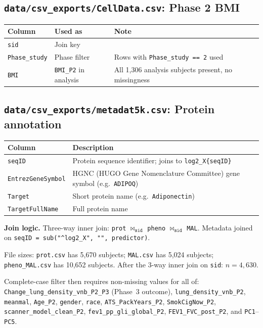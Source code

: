 \documentclass[11pt, letterpaper]{article}
\begin{document}
\subsection*{\texttt{data/csv\_exports/CellData.csv}: Phase 2 BMI}

\begin{tabular}{lll}
\toprule
Column & Used as & Note \\
\midrule
\texttt{sid}          & Join key   & \\
\texttt{Phase\_study} & Phase filter & Rows with \texttt{Phase\_study == 2} used \\
\texttt{BMI}          & \texttt{BMI\_P2} in analysis & All 1,306 analysis subjects present, no missingness \\
\bottomrule
\end{tabular}

\subsection*{\texttt{data/csv\_exports/metadat5k.csv}: Protein annotation}

\begin{tabular}{ll}
\toprule
Column & Description \\
\midrule
\texttt{seqID}              & Protein sequence identifier; joins to \texttt{log2\_X\{seqID\}} \\
\texttt{EntrezGeneSymbol}   & HGNC (HUGO Gene Nomenclature Committee) gene symbol (e.g.\ \texttt{ADIPOQ}) \\
\texttt{Target}             & Short protein name (e.g.\ \texttt{Adiponectin}) \\
\texttt{TargetFullName}     & Full protein name \\
\bottomrule
\end{tabular}

\vspace{8pt}
\noindent\textbf{Join logic.} Three-way inner join:
\texttt{prot} $\bowtie_{\texttt{sid}}$ \texttt{pheno} $\bowtie_{\texttt{sid}}$ \texttt{MAL}.
Metadata joined on \texttt{seqID = sub("\^{}log2\_X", "", predictor)}.

File sizes: \texttt{prot.csv} has 5,670 subjects; \texttt{MAL.csv}
has 5,024 subjects; \texttt{pheno\_MAL.csv} has 10,652 subjects.
After the 3-way inner join on \texttt{sid}: $n = 4{,}630$.

Complete-case filter then requires non-missing values for all of:
\texttt{Change\_lung\_density\_vnb\_P2\_P3} (Phase~3 outcome),
\texttt{lung\_density\_vnb\_P2}, \texttt{meanmal}, \texttt{Age\_P2},
\texttt{gender}, \texttt{race}, \texttt{ATS\_PackYears\_P2},
\texttt{SmokCigNow\_P2}, \texttt{scanner\_model\_clean\_P2},
\texttt{fev1\_pp\_gli\_global\_P2},
\texttt{FEV1\_FVC\_post\_P2}, and \texttt{PC1}--\texttt{PC5}.
\end{document}

